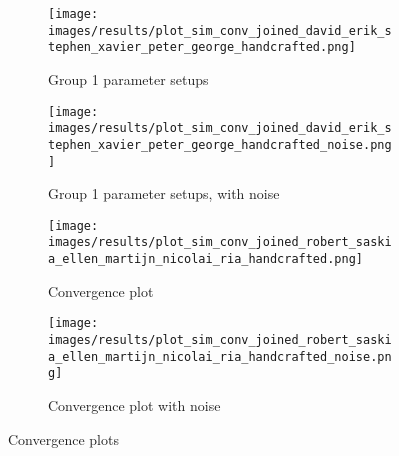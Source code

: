 
\begin{figure}[ht]
	\begin{subfigure}{0.48\linewidth}
	\texttt{[image: images/results/plot\_sim\_conv\_joined\_david\_erik\_stephen\_xavier\_peter\_george\_handcrafted.png]}
	\caption{Group 1 parameter setups}
	\label{fig:conv_group1_handcrafted}
	\end{subfigure}
	\hfill
	\begin{subfigure}{0.48\linewidth}
	\texttt{[image: images/results/plot\_sim\_conv\_joined\_david\_erik\_stephen\_xavier\_peter\_george\_handcrafted\_noise.png]}
	\caption{Group 1 parameter setups, with noise}
	\label{fig:conv_group1_handcrafted_noise}
	\end{subfigure}
	\begin{subfigure}{0.48\linewidth}
	\texttt{[image: images/results/plot\_sim\_conv\_joined\_robert\_saskia\_ellen\_martijn\_nicolai\_ria\_handcrafted.png]}
	\caption{Convergence plot}
	\label{fig:conv_group2_handcrafted}
	\end{subfigure}
	\hfill
	\begin{subfigure}{0.48\linewidth}
	\texttt{[image: images/results/plot\_sim\_conv\_joined\_robert\_saskia\_ellen\_martijn\_nicolai\_ria\_handcrafted\_noise.png]}
	\caption{Convergence plot with noise}
	\label{fig:conv_group2_handcrafted_noise}
	\end{subfigure}
	\caption{Convergence plots}
	\label{fig:conv_joined_with_without_placeholder2}
\end{figure}


